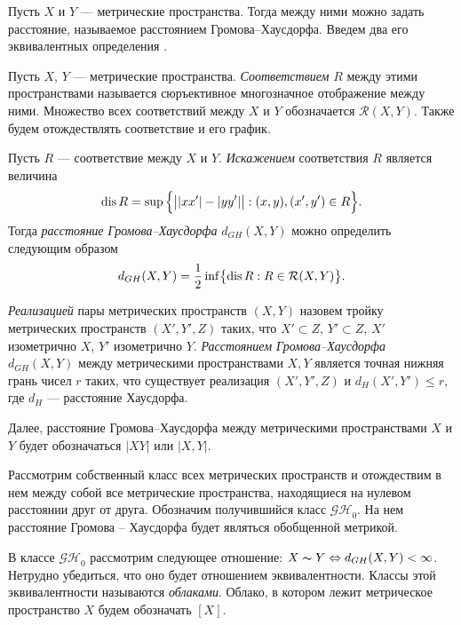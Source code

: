 Пусть $X$ и $Y$ ---
метрические пространства. Тогда между ними можно задать расстояние, называемое
расстоянием Громова--Хаусдорфа. Введем два его эквивалентных 
определения \cite{Lectures}.
\begin{defin}
	Пусть $X$, $Y$ --- метрические пространства. \emph{Соответствием} $R$ между этими пространствами
	называется сюръективное многозначное отображение между ними.
	Множество всех соответствий между $X$ и $Y$ обозначается
	$\mathcal{R}(X,Y)$. Также будем отождествлять соответствие и его график.
\end{defin}
\begin{defin}
	Пусть $R$ --- соответствие между $X$ и $Y$.
	\emph{Искажением} соответствия $R$ является величина
	$$ \operatorname{dis}{R} = \sup{\Bigl\{ \big| |xx'| - |yy'| \big| : (x, y), (x', y') \in R\Bigr\}}.$$
	Тогда \emph{расстояние Громова--Хаусдорфа} $d_{GH}(X,Y)$ можно определить
	следующим образом
	$$ d_{GH}(X,Y) = \frac{1}{2}\inf \bigl\{\operatorname{dis}{R} : R \in \mathcal{R}(X,Y)\bigr\}.$$
	\label{defSootvet}
\end{defin}

\begin{defin}
	\emph{Реализацией} пары метрических пространств $(X,Y)$ назовем тройку
	метрических пространств $(X',Y',Z)$ таких, что $X' \subset Z$, $Y' \subset Z$,
	$X'$ изометрично $X$, $Y'$ изометрично $Y$. \emph{Расстоянием Громова--Хаусдорфа}
	$d_{GH}(X,Y)$ между метрическими пространствами $X, Y$ является точная нижняя
	грань чисел $r$ таких, что существует реализация $(X',Y',Z)$ и $d_H(X', Y')
	\le
	r$, где $d_H$ --- расстояние Хаусдорфа.
\end{defin}
Далее, расстояние Громова--Хаусдорфа между метрическими пространствами $X$ и $Y$ будет обозначаться $|XY|$ или \( | X,Y | \).

Рассмотрим собственный класс всех метрических пространств и отождествим в нем между собой все метрические пространства, находящиеся на нулевом расстоянии друг от друга. Обозначим получившийся класс $\mathcal{GH}_0$.  На нем расстояние Громова -- Хаусдорфа будет являться обобщенной метрикой.

\begin{defin} В классе $\mathcal{GH}_{0}$ рассмотрим следующее
	отношение: $X \thicksim Y \Leftrightarrow d_{GH}(X, Y) < \infty$. Нетрудно
	убедиться, что оно будет отношением эквивалентности. Классы этой эквивалентности
	называются \emph{облаками}. Облако, в котором лежит метрическое пространство $X$
	будем обозначать $[X]$.
\end{defin}

